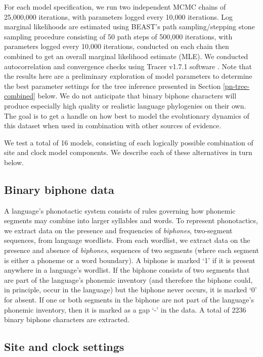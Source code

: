 For each model specification, we run two independent MCMC chains of 25,000,000 iterations, with parameters logged every 10,000 iterations. Log marginal likelihoods are estimated using BEAST's path sampling/stepping stone sampling procedure \autocite{baele_accurate_2013} consisting of 50 path steps of 500,000 iterations, with parameters logged every 10,000 iterations, conducted on each chain then combined to get an overall marginal likelihood estimate (MLE). We conducted autocorrelation and convergence checks using Tracer v1.7.1 software \autocite{rambaut_posterior_2018}. Note that the results here are a preliminary exploration of model parameters to determine the best parameter settings for the tree inference presented in Section \ref{pn-tree-combined} below. We do not anticipate that binary biphone characters will produce especially high quality or realistic language phylogenies on their own. The goal is to get a handle on how best to model the evolutionary dynamics of this dataset when used in combination with other sources of evidence.

We test a total of 16 models, consisting of each logically possible combination of site and clock model components. We describe each of these alternatives in turn below.

\hypertarget{binary-biphone-data}{%
\subsection{Binary biphone data}\label{binary-biphone-data}}

A language's phonotactic system consists of rules governing how phonemic segments may combine into larger syllables and words. To represent phonotactics, we extract data on the presence and frequencies of \emph{biphones}, two-segment sequences, from language wordlists. From each wordlist, we extract data on the presence and absence of \emph{biphones}, sequences of two segments (where each segment is either a phoneme or a word boundary). A biphone is marked `1' if it is present anywhere in a language's wordlist. If the biphone consists of two segments that are part of the language's phonemic inventory (and therefore the biphone could, in principle, occur in the language) but the biphone never occurs, it is marked `0' for absent. If one or both segments in the biphone are not part of the language's phonemic inventory, then it is marked as a gap `-' in the data. A total of 2236 binary biphone characters are extracted.

\hypertarget{site-and-clock-settings}{%
\subsection{Site and clock settings}\label{site-and-clock-settings}}

